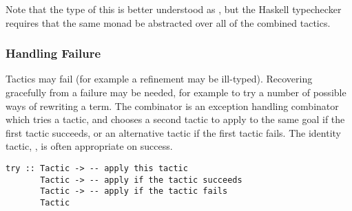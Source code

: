 Note that the type of this is better understood as , but the Haskell typechecker requires that the same monad be
abstracted over all of the combined tactics.

\subsubsection{Handling Failure}
Tactics may fail (for example a refinement may be ill-typed). 
Recovering gracefully from a failure may be needed, for
example to try a number of possible ways of rewriting a term.
The  combinator is an exception handling combinator which
tries a tactic, and chooses a second tactic to apply to the same goal
if the first tactic succeeds, or an alternative tactic if the first
tactic fails.
The identity tactic, , is often appropriate on success.

\begin{verbatim}
try :: Tactic -> -- apply this tactic
       Tactic -> -- apply if the tactic succeeds
       Tactic -> -- apply if the tactic fails
       Tactic
\end{verbatim}



